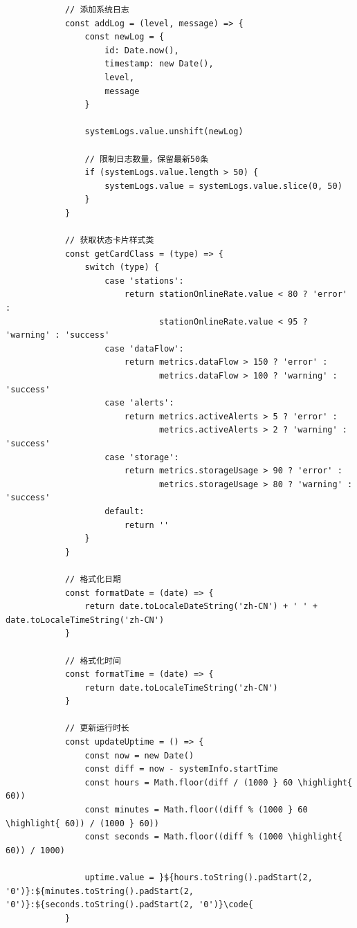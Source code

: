 \begin{verbatim}
            // 添加系统日志
            const addLog = (level, message) => {
                const newLog = {
                    id: Date.now(),
                    timestamp: new Date(),
                    level,
                    message
                }
                
                systemLogs.value.unshift(newLog)
                
                // 限制日志数量，保留最新50条
                if (systemLogs.value.length > 50) {
                    systemLogs.value = systemLogs.value.slice(0, 50)
                }
            }
            
            // 获取状态卡片样式类
            const getCardClass = (type) => {
                switch (type) {
                    case 'stations':
                        return stationOnlineRate.value < 80 ? 'error' : 
                               stationOnlineRate.value < 95 ? 'warning' : 'success'
                    case 'dataFlow':
                        return metrics.dataFlow > 150 ? 'error' : 
                               metrics.dataFlow > 100 ? 'warning' : 'success'
                    case 'alerts':
                        return metrics.activeAlerts > 5 ? 'error' : 
                               metrics.activeAlerts > 2 ? 'warning' : 'success'
                    case 'storage':
                        return metrics.storageUsage > 90 ? 'error' : 
                               metrics.storageUsage > 80 ? 'warning' : 'success'
                    default:
                        return ''
                }
            }
            
            // 格式化日期
            const formatDate = (date) => {
                return date.toLocaleDateString('zh-CN') + ' ' + date.toLocaleTimeString('zh-CN')
            }
            
            // 格式化时间
            const formatTime = (date) => {
                return date.toLocaleTimeString('zh-CN')
            }
            
            // 更新运行时长
            const updateUptime = () => {
                const now = new Date()
                const diff = now - systemInfo.startTime
                const hours = Math.floor(diff / (1000 } 60 \highlight{ 60))
                const minutes = Math.floor((diff % (1000 } 60 \highlight{ 60)) / (1000 } 60))
                const seconds = Math.floor((diff % (1000 \highlight{ 60)) / 1000)
                
                uptime.value = }${hours.toString().padStart(2, '0')}:${minutes.toString().padStart(2, '0')}:${seconds.toString().padStart(2, '0')}\code{
            }
            

\end{verbatim}
